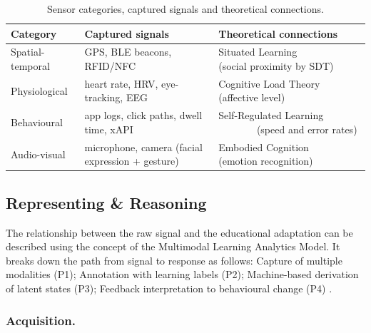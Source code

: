 \documentclass[runningheads]{llncs}
\begin{document}

\begin{table}[tb]
\centering
\caption{Sensor categories, captured signals and theoretical connections.}
\label{tab:mapping}
\small
\begin{tabular}{>{\raggedright\arraybackslash}p{2.6cm}>{\raggedright\arraybackslash}p{4.2cm}>{\raggedright\arraybackslash}p{4.6cm}}
\hline
\textbf{Category} & \textbf{Captured signals} & \textbf{Theoretical connections} \\
\hline
Spatial-temporal & GPS, BLE beacons, RFID/NFC & Situated Learning ~~~~~~~~~~ (social proximity by SDT) \\
Physiological & heart rate, HRV, eye-tracking, EEG & Cognitive Load Theory ~~~~~~~ (affective level) \\
Behavioural & app logs, click paths, dwell time, xAPI & Self-Regulated Learning ~~~~~~~ (speed and error rates) \\
Audio-visual & microphone, camera (facial expression + gesture) & Embodied Cognition ~~~~~~~ (emotion recognition) \\
\hline
\end{tabular}
\end{table}



\subsection{Representing \& Reasoning}

The relationship between the raw signal and the educational adaptation can be described using the concept of the Multimodal Learning Analytics Model. It breaks down the path from signal to response as follows: Capture of multiple modalities (P1); Annotation with learning labels (P2);  Machine-based derivation of latent states (P3); Feedback interpretation to behavioural change (P4) \cite{di_mitri_signals_2018}.


\subsubsection{Acquisition.}
\end{document}
